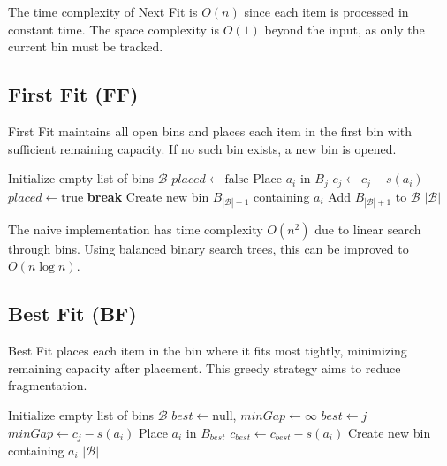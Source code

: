 \documentclass[11pt,a4paper]{article}
\begin{document}
The time complexity of Next Fit is $O(n)$ since each item is processed in constant time. The space complexity is $O(1)$ beyond the input, as only the current bin must be tracked.

\subsection{First Fit (FF)}

First Fit maintains all open bins and places each item in the first bin with sufficient remaining capacity. If no such bin exists, a new bin is opened.

\begin{algorithm}[H]
\caption{First Fit}
\begin{algorithmic}[1]
\STATE Initialize empty list of bins $\mathcal{B}$
    \STATE $placed \gets \text{false}$
            \STATE Place $a_i$ in $B_j$
            \STATE $c_j \gets c_j - s(a_i)$
            \STATE $placed \gets \text{true}$
            \STATE \textbf{break}
        \ENDIF
    \ENDFOR
        \STATE Create new bin $B_{|\mathcal{B}|+1}$ containing $a_i$
        \STATE Add $B_{|\mathcal{B}|+1}$ to $\mathcal{B}$
    \ENDIF
\ENDFOR
\RETURN $|\mathcal{B}|$
\end{algorithmic}
\end{algorithm}

The naive implementation has time complexity $O(n^2)$ due to linear search through bins. Using balanced binary search trees, this can be improved to $O(n \log n)$.

\subsection{Best Fit (BF)}

Best Fit places each item in the bin where it fits most tightly, minimizing remaining capacity after placement. This greedy strategy aims to reduce fragmentation.

\begin{algorithm}[H]
\caption{Best Fit}
\begin{algorithmic}[1]
\STATE Initialize empty list of bins $\mathcal{B}$
    \STATE $best \gets \text{null}$, $minGap \gets \infty$
            \STATE $best \gets j$
            \STATE $minGap \gets c_j - s(a_i)$
        \ENDIF
    \ENDFOR
        \STATE Place $a_i$ in $B_{best}$
        \STATE $c_{best} \gets c_{best} - s(a_i)$
    \ELSE
        \STATE Create new bin containing $a_i$
    \ENDIF
\ENDFOR
\RETURN $|\mathcal{B}|$
\end{algorithmic}
\end{algorithm}
\end{document}
